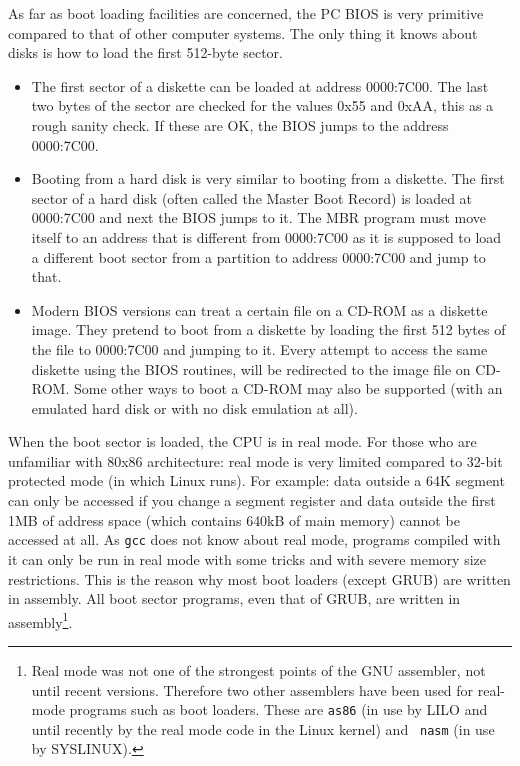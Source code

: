 \documentclass[12pt,a4paper]{article}
\begin{document}
As far as boot loading facilities are concerned, the PC BIOS is very
primitive compared to that of other computer systems. The only thing
it knows about disks is how to load the first 512-byte sector.
\begin{itemize}
\item The first sector of a diskette can be loaded at address
  0000:7C00. The last two bytes of the sector are checked for the
  values 0x55 and 0xAA, this as a rough sanity check. If these are OK,
  the BIOS jumps to the address 0000:7C00.
\item Booting from a hard disk is very similar to booting from a
  diskette. The first sector of a hard disk (often called the Master
  Boot Record) is loaded at 0000:7C00 and next the BIOS jumps to
  it. The MBR program must move itself to an address that is different
  from 0000:7C00 as it is supposed to load a different boot sector
  from a partition to address 0000:7C00 and jump to that.
\item Modern BIOS versions can treat a certain file on a CD-ROM as a
  diskette image. They pretend to boot from a diskette by loading the
  first 512 bytes of the file to 0000:7C00 and jumping to it. Every
  attempt to access the same diskette using the BIOS routines, will be
  redirected to the image file on CD-ROM. Some other ways to boot a
  CD-ROM may also be supported (with an emulated hard disk or with no
  disk emulation at all).
\end{itemize}

When the boot sector is loaded, the CPU is in real mode. For those who
are unfamiliar with 80x86 architecture: real mode is very limited
compared to 32-bit protected mode (in which Linux runs). For example:
data outside a 64K segment can only be accessed if you change a
segment register and data outside the first 1MB of address space
(which contains 640kB of main memory) cannot be accessed at all. As
{\tt gcc} does not know about real mode, programs compiled with it can
only be run in real mode with some tricks and with severe memory size
restrictions. This is the reason why most boot loaders (except GRUB)
are written in assembly. All boot sector programs, even that of GRUB,
are written in assembly\footnote{Real mode was not one of the
strongest points of the GNU assembler, not until recent
versions. Therefore two other assemblers have been used for real-mode
programs such as boot loaders. These are {\tt as86} (in use by LILO
and until recently by the real mode code in the Linux kernel) and {\tt
  nasm} (in use by SYSLINUX).}.
\end{document}
